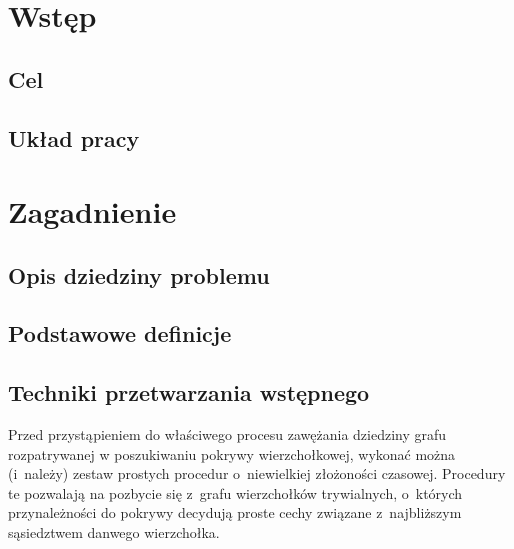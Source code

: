 \chapter{Wstęp}\label{Chapter_Wstep}

  \section{Cel}\label{Section_Aim}

  \section{Układ pracy}\label{Section_Layout}

\chapter{Zagadnienie }\label{Chapter_Domain}
  \section{Opis dziedziny problemu}\label{Section_Problematyka}

  \section{Podstawowe definicje}\label{Section_Definicje}

  \section{Techniki przetwarzania wstępnego}\label{Section_preprocessing}

  Przed przystąpieniem do właściwego procesu zawężania dziedziny grafu
  rozpatrywanej w poszukiwaniu pokrywy wierzchołkowej, wykonać można (i~należy)
  zestaw prostych procedur o~niewielkiej złożoności czasowej.
  Procedury te pozwalają na pozbycie się z~grafu wierzchołków trywialnych,
  o~których przynależności do pokrywy decydują proste cechy związane
  z~najbliższym sąsiedztwem danwego wierzchołka.


